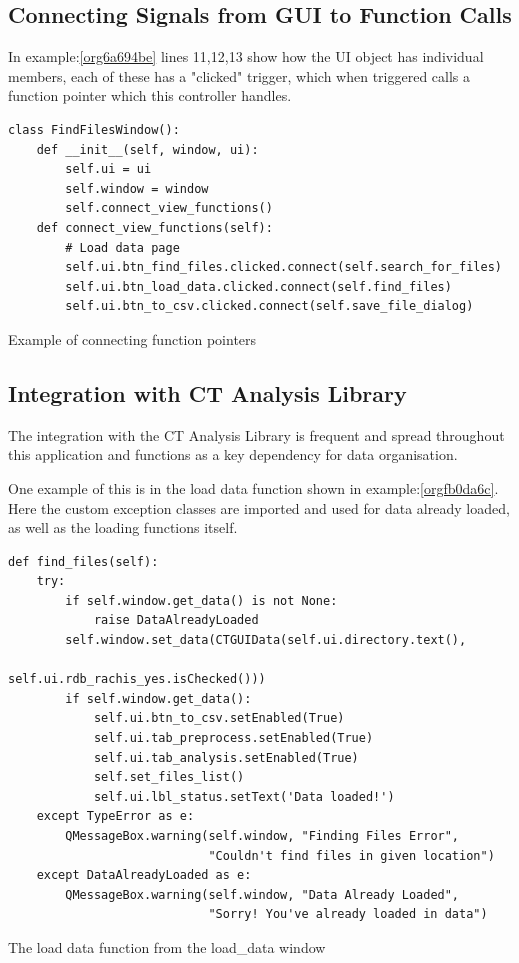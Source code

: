 \documentclass[11pt]{report}
\begin{document}
\subsection{Connecting Signals from GUI to Function Calls}
\label{sec:orgeb1f57c}
In example:\ref{org6a694be} lines 11,12,13 show how the UI object has individual members, each of these has a "clicked" trigger, which when triggered calls a function pointer which this controller handles.
\begin{listing}[htbp]
\begin{verbatim}
class FindFilesWindow():
    def __init__(self, window, ui):
        self.ui = ui
        self.window = window
        self.connect_view_functions()
    def connect_view_functions(self):
        # Load data page
        self.ui.btn_find_files.clicked.connect(self.search_for_files)
        self.ui.btn_load_data.clicked.connect(self.find_files)
        self.ui.btn_to_csv.clicked.connect(self.save_file_dialog)
\end{verbatim}
\caption{\label{org6a694be}
Example of connecting function pointers}
\end{listing}

\subsection{Integration with CT Analysis Library}
\label{sec:org823d62a}

The integration with the CT Analysis Library is frequent and spread throughout this application and functions as a key dependency for data organisation.

One example of this is in the load data function shown in example:\ref{orgfb0da6c}. Here the custom exception classes are imported and used for data already loaded, as well as the loading functions itself.

\begin{listing}[htbp]
\begin{verbatim}
def find_files(self):
    try:
        if self.window.get_data() is not None:
            raise DataAlreadyLoaded
        self.window.set_data(CTGUIData(self.ui.directory.text(),
                                       self.ui.rdb_rachis_yes.isChecked()))
        if self.window.get_data():
            self.ui.btn_to_csv.setEnabled(True)
            self.ui.tab_preprocess.setEnabled(True)
            self.ui.tab_analysis.setEnabled(True)
            self.set_files_list()
            self.ui.lbl_status.setText('Data loaded!')
    except TypeError as e:
        QMessageBox.warning(self.window, "Finding Files Error",
                            "Couldn't find files in given location")
    except DataAlreadyLoaded as e:
        QMessageBox.warning(self.window, "Data Already Loaded",
                            "Sorry! You've already loaded in data")
\end{verbatim}
\caption{\label{orgfb0da6c}
The load data function from the load\_data window}
\end{listing}
\end{document}
